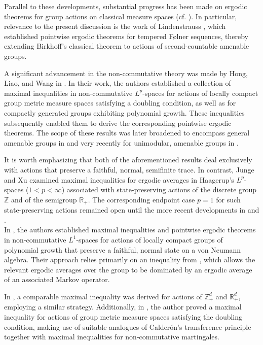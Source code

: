\documentclass[11pt]{amsart}
\theoremstyle{definition}
\theoremstyle{myremark}
\numberwithin{equation}{section}
\begin{document}
Parallel to these developments, substantial progress has been made on ergodic theorems for group actions on classical measure spaces (cf. \cite{anantharaman2010ergodic, calderon1953general}). In particular, relevance to the present discussion is the work of Lindenstrauss \cite{Lindenstrauss2001}, which established pointwise ergodic theorems for tempered Følner sequences, thereby extending Birkhoff’s classical theorem to actions of second-countable amenable groups.  

A significant advancement in the non-commutative theory was made by Hong, Liao, and Wang in \cite{Hong2021}. In their work, the authors established a collection of maximal inequalities in non-commutative \(L^{p}\)-spaces for actions of locally compact group metric measure spaces satisfying a doubling condition, as well as for compactly generated groups exhibiting polynomial growth. These inequalities subsequently enabled them to derive the corresponding pointwise ergodic theorems. The scope of these results was later broadened to encompass general amenable groups in \cite{cadilhac2022noncommutative} and very recently for unimodular, amenable groups in \cite{chakraborty2025ergodic}.






It is worth emphasizing that both of the aforementioned results deal exclusively with actions that preserve a faithful, normal, semifinite trace. In contrast, Junge and Xu \cite{Junge2007} examined maximal inequalities for ergodic averages in Haagerup’s \(L^{p}\)-spaces (\(1 < p < \infty\)) associated with state-preserving actions of the discrete group \(\mathbb{Z}\) and of the semigroup \(\mathbb{R}_{+}\). The corresponding endpoint case \(p = 1\) for such state-preserving actions remained open until the more recent developments in \cite{Bik-Dip-neveu} and \cite{pg-ds-ergo-semi}. \\

In \cite{Bik-Dip-neveu}, the authors established maximal inequalities and pointwise ergodic theorems in non-commutative \(L^{1}\)-spaces for actions of locally compact groups of polynomial growth that preserve a faithful, normal state on a von Neumann algebra. Their approach relies primarily on an inequality from \cite[Proposition 4.8]{Hong2021}, which allows the relevant ergodic averages over the group to be dominated by an ergodic average of an associated Markov operator.

In \cite{pg-ds-ergo-semi}, a comparable maximal inequality was derived for actions of \(\mathbb{Z}^{d}_{+}\) and \(\mathbb{R}^{d}_{+}\), employing a similar strategy. Additionally, in \cite{Bik-Dip-Amenable}, the author proved a maximal inequality for actions of group metric measure spaces satisfying the doubling condition, making use of suitable analogues of Calderón’s transference principle together with maximal inequalities for non-commutative martingales.
\end{document}
